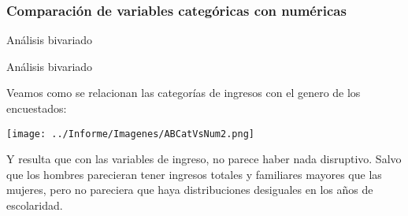 \documentclass[pdf]{beamer}
\begin{document}
    \subsubsection{Comparación de variables categóricas con numéricas}

\begin{frame}{Análisis bivariado}


\end{frame}

 
 
\begin{frame}{Análisis bivariado}
    \footnotesize

    Veamos como se relacionan las categorías de ingresos con el genero de los encuestados:
    \begin{center}
        \texttt{[image: ../Informe/Imagenes/ABCatVsNum2.png]}
    \end{center}
    Y resulta que con las variables de ingreso, no parece haber nada disruptivo. Salvo que los hombres parecieran tener ingresos totales y familiares mayores que las mujeres, pero no pareciera que haya distribuciones desiguales en los años de escolaridad.

\end{frame}

 
 
 
\end{document}
